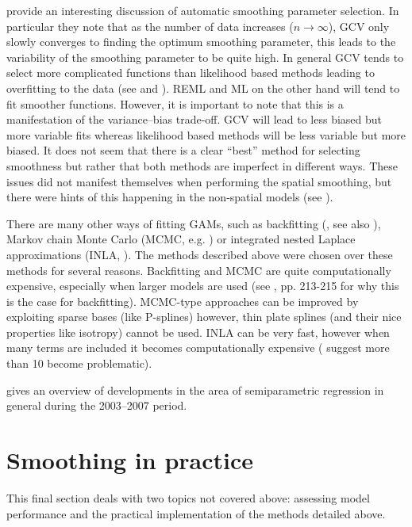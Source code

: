  provide an interesting discussion of automatic smoothing parameter selection. In particular they note that as the number of data increases ($n\rightarrow\infty$), GCV only slowly converges to finding the optimum smoothing parameter, this leads to the variability of the smoothing parameter to be quite high. In general GCV tends to select more complicated functions than likelihood based methods leading to overfitting to the data (see \cite{remlpaper} and \cite{reissogden}). REML and ML on the other hand will tend to fit smoother functions. However, it is important to note that this is a manifestation of the variance--bias trade-off. GCV will lead to less biased but more variable fits whereas likelihood based methods will be less variable but more biased. It does not seem that there is a clear ``best'' method for selecting smoothness but rather that both methods are imperfect in different ways. These issues did not manifest themselves when performing the spatial smoothing, but there were hints of this happening in the non-spatial models (see ).

There are many other ways of fitting GAMs, such as backfitting (\cite{gammonograph}, see also ), Markov chain Monte Carlo (MCMC, e.g. \cite{fahrmeir2004}) or integrated nested Laplace approximations (INLA, \cite{inla}). The methods described above were chosen over these methods for several reasons. Backfitting and MCMC are quite computationally expensive, especially when larger models are used (see \cite{simonbook}, pp. 213-215 for why this is the case for backfitting). MCMC-type approaches can be improved by exploiting sparse bases (like P-splines) however, thin plate splines (and their nice properties like isotropy) cannot be used. INLA can be very fast, however when many terms are included it becomes computationally expensive (\cite{inla} suggest more than 10 become problematic).

\cite{ruppertreview} gives an overview of developments in the area of semiparametric regression in general during the 2003--2007 period.

\section{Smoothing in practice}
\label{intro-inpractice}

This final section deals with two topics not covered above: assessing model performance and the practical implementation of the methods detailed above.


